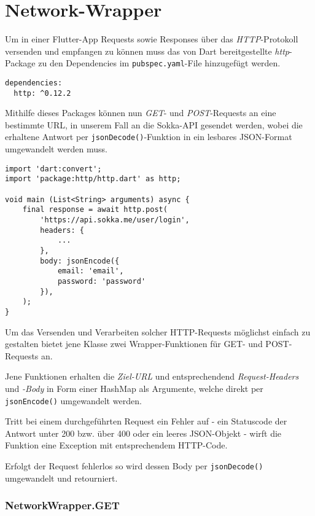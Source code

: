 \section{Network-Wrapper}

Um in einer Flutter-App Requests sowie Responses über das \textit{HTTP}-Protokoll versenden und empfangen zu können
muss das von Dart bereitgestellte \textit{http}-Package zu den Dependencies im \lstinline{pubspec.yaml}-File hinzugefügt
werden.

\begin{lstlisting}
dependencies:
  http: ^0.12.2
\end{lstlisting}

Mithilfe dieses Packages können nun \textit{GET}- und \textit{POST}-Requests an eine bestimmte URL, in unserem Fall
an die Sokka-API gesendet werden, wobei die erhaltene Antwort per \lstinline{jsonDecode()}-Funktion in ein lesbares
JSON-Format umgewandelt werden muss.

\begin{lstlisting}
import 'dart:convert';
import 'package:http/http.dart' as http;

void main (List<String> arguments) async {
    final response = await http.post(
        'https://api.sokka.me/user/login',
        headers: {
            ...
        },
        body: jsonEncode({
            email: 'email',
            password: 'password'
        }),
    );
}
\end{lstlisting}

Um das Versenden und Verarbeiten solcher HTTP-Requests möglichst einfach zu gestalten bietet jene
Klasse zwei Wrapper-Funktionen für GET- und POST-Requests an.

Jene Funktionen erhalten die \textit{Ziel-URL} und entsprechendend \textit{Request-Headers} und \textit{-Body} in Form einer HashMap
als Argumente, welche direkt per \lstinline{jsonEncode()} umgewandelt werden.

Tritt bei einem durchgeführten Request ein Fehler auf - ein Statuscode der Antwort unter 200 bzw. über 400 oder ein
leeres JSON-Objekt - wirft die Funktion eine Exception mit entsprechendem HTTP-Code.

\pagebreak

Erfolgt der Request fehlerlos so wird dessen Body per \lstinline{jsonDecode()} umgewandelt und retourniert.

\subsubsection{NetworkWrapper.GET}

